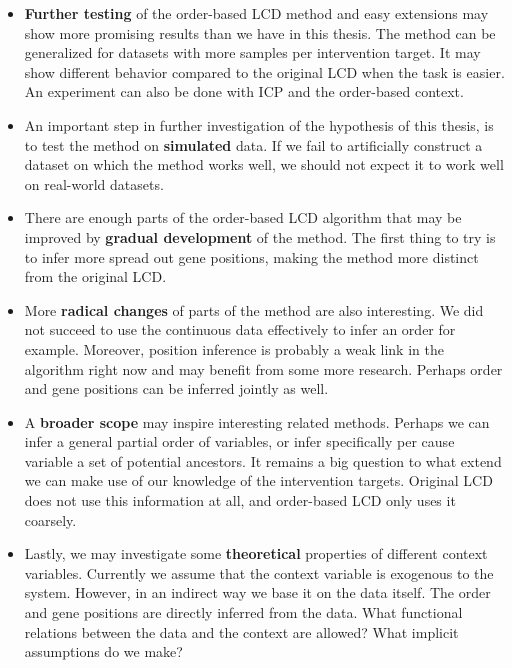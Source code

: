 \begin{itemize}
    \item \textbf{Further testing} of the order-based LCD method and easy extensions may show more promising results than we have in this thesis. The method can be generalized for datasets with more samples per intervention target. It may show different behavior compared to the original LCD when the task is easier. An experiment can also be done with ICP and the order-based context.
    \item An important step in further investigation of the hypothesis of this thesis, is to test the method on \textbf{simulated} data. If we fail to artificially construct a dataset on which the method works well, we should not expect it to work well on real-world datasets.
    \item There are enough parts of the order-based LCD algorithm that may be improved by \textbf{gradual development} of the method. The first thing to try is to infer more spread out gene positions, making the method more distinct from the original LCD.
    \item More \textbf{radical changes} of parts of the method are also interesting. We did not succeed to use the continuous data effectively to infer an order for example. Moreover, position inference is probably a weak link in the algorithm right now and may benefit from some more research. Perhaps order and gene positions can be inferred jointly as well.
    \item A \textbf{broader scope} may inspire interesting related methods. Perhaps we can infer a general partial order of variables, or infer specifically per cause variable a set of potential ancestors. It remains a big question to what extend we can make use of our knowledge of the intervention targets. Original LCD does not use this information at all, and order-based LCD only uses it coarsely. 
    \item Lastly, we may investigate some \textbf{theoretical} properties of different context variables. Currently we assume that the context variable is exogenous to the system. However, in an indirect way we base it on the data itself. The order and gene positions are directly inferred from the data. What functional relations between the data and the context are allowed? What implicit assumptions do we make?
\end{itemize}




